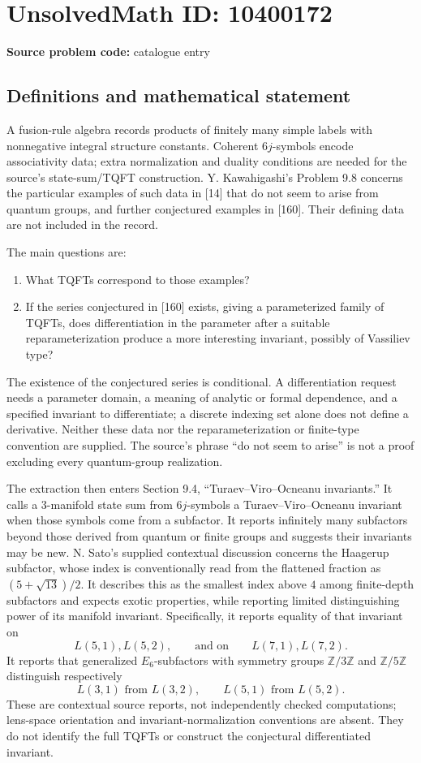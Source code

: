\documentclass[11pt]{article}
\newcommand{\Z}{\mathbb{Z}}
\begin{document}
\section*{UnsolvedMath ID: 10400172}
\textbf{Source problem code:} catalogue entry
\subsection{Definitions and mathematical statement}
A fusion-rule algebra records products of finitely many simple labels with nonnegative integral structure constants. Coherent \(6j\)-symbols encode associativity data; extra normalization and duality conditions are needed for the source's state-sum/TQFT construction. Y. Kawahigashi's Problem 9.8 concerns the particular examples of such data in [14] that do not seem to arise from quantum groups, and further conjectured examples in [160]. Their defining data are not included in the record.

The main questions are:
\begin{enumerate}
\item What TQFTs correspond to those examples?
\item If the series conjectured in [160] exists, giving a parameterized family of TQFTs, does differentiation in the parameter after a suitable reparameterization produce a more interesting invariant, possibly of Vassiliev type?
\end{enumerate}
The existence of the conjectured series is conditional. A differentiation request needs a parameter domain, a meaning of analytic or formal dependence, and a specified invariant to differentiate; a discrete indexing set alone does not define a derivative. Neither these data nor the reparameterization or finite-type convention are supplied. The source's phrase ``do not seem to arise'' is not a proof excluding every quantum-group realization.

The extraction then enters Section 9.4, ``Turaev--Viro--Ocneanu invariants.'' It calls a \(3\)-manifold state sum from \(6j\)-symbols a Turaev--Viro--Ocneanu invariant when those symbols come from a subfactor. It reports infinitely many subfactors beyond those derived from quantum or finite groups and suggests their invariants may be new. N. Sato's supplied contextual discussion concerns the Haagerup subfactor, whose index is conventionally read from the flattened fraction as \((5+\sqrt{13})/2\). It describes this as the smallest index above \(4\) among finite-depth subfactors and expects exotic properties, while reporting limited distinguishing power of its manifold invariant. Specifically, it reports equality of that invariant on
\[
 L(5,1),L(5,2),\qquad\text{and on}\qquad L(7,1),L(7,2).
\]
It reports that generalized \(E_6\)-subfactors with symmetry groups \(\Z/3\Z\) and \(\Z/5\Z\) distinguish respectively
\[
 L(3,1)\text{ from }L(3,2),\qquad
 L(5,1)\text{ from }L(5,2).
\]
These are contextual source reports, not independently checked computations; lens-space orientation and invariant-normalization conventions are absent. They do not identify the full TQFTs or construct the conjectural differentiated invariant.
\end{document}
